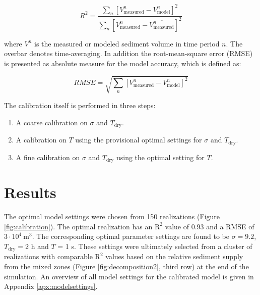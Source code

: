 \begin{equation}
  \label{eq:r2}
  R^2 = \frac{\sum_n \left[ V^n_{\mathrm{measured}} - V^n_{\mathrm{model}} \right]^2}{\sum_n \left[ V^n_{\mathrm{measured}} - \overline{V^n_{\mathrm{measured}}} \right]^2}
\end{equation}

\noindent where $V^n$ is the measured or modeled sediment volume in
time period $n$. The overbar denotes time-averaging. In addition the
root-mean-square error (RMSE) is presented as absolute measure for the
model accuracy, which is defined as:

\begin{equation}
  \label{eq:rmse}
  RMSE = \sqrt{\sum_n \left[ V^n_{\mathrm{measured}} - V^n_{\mathrm{model}} \right]^2}
\end{equation}

\noindent The calibration itself is performed in three steps:

\begin{enumerate}
\item A coarse calibration on $\sigma$ and $T_{\mathrm{dry}}$.
\item A calibration on $T$ using the provisional optimal settings for
  $\sigma$ and $T_{\mathrm{dry}}$.
\item A fine calibration on $\sigma$ and $T_{\mathrm{dry}}$ using the
  optimal setting for $T$.
\end{enumerate}

\section{Results}

The optimal model settings were chosen from 150 realizations (Figure
\ref{fig:calibration}). The optimal realization has an $\mathrm{R^2}$
value of 0.93 and a RMSE of $3 \cdot 10^4 ~ \mathrm{m^3}$.
The corresponding optimal parameter settings are found to be
$\sigma = 9.2$, $T_{\mathrm{dry}} = 2$ h and $T$ = 1 s. These
settings were ultimately selected from a cluster of realizations with
comparable $\mathrm{R^2}$ values based on the relative sediment supply
from the mixed zones (Figure \ref{fig:decomposition2}, third row) at
the end of the simulation. An overview of all model settings for the
calibrated model is given in Appendix \ref{apx:modelsettings}.


